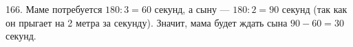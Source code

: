 166. Маме потребуется $180:3=60$ секунд, а сыну --- $180:2=90$ секунд (так как он прыгает на 2 метра за секунду). Значит, мама будет ждать сына $90-60=30$ секунд.\\
